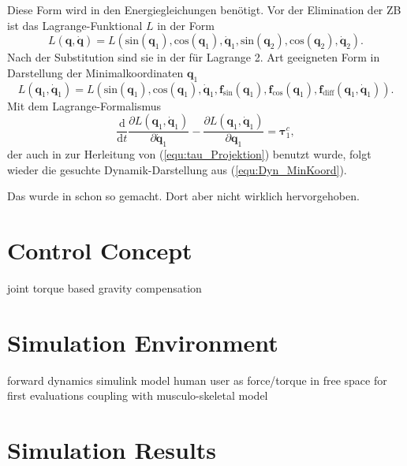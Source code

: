 \documentclass[letterpaper, 10 pt, conference]{ieeeconf}  %
\begin{document}
\label{sec:Lagrange2Elim}
%
Diese Form wird in den Energiegleichungen benötigt.
Vor der Elimination der ZB ist das Lagrange-Funktional $L$ in der Form
\begin{equation}
L(\bm{q},\dot{\bm{q}})=L(\mathrm{sin}(\bm{q}_1),\mathrm{cos}(\bm{q}_1),\dot{\bm{q}}_1,\mathrm{sin}(\bm{q}_2),\mathrm{cos}(\bm{q}_2),\dot{\bm{q}}_2).
\end{equation}
Nach der Substitution sind sie in der für Lagrange 2. Art geeigneten Form in Darstellung der Minimalkoordinaten $\bm{q}_1$
%
\begin{equation}
L(\bm{q}_1,\dot{\bm{q}}_1)=L(\mathrm{sin}(\bm{q}_1),\mathrm{cos}(\bm{q}_1),\dot{\bm{q}}_1,\bm{f}_\mathrm{sin}(\bm{q}_1),\bm{f}_\mathrm{cos}(\bm{q}_1), \bm{f}_\mathrm{diff}(\bm{q}_1,\dot{\bm{q}}_1)).
\end{equation}
%
Mit dem Lagrange-Formalismus
%
\begin{equation}
\frac{\mathrm{d}}{\mathrm{d}t}\frac{\partial L(\bm{q}_1,\dot{\bm{q}}_1)}{\partial \dot{\bm{q}}_1} - \frac{\partial L(\bm{q}_1,\dot{\bm{q}}_1)}{\partial \bm{q}_1} = \bm{\tau}^c_1,
\end{equation}
%
der auch in \cite{NakamuraGho1989} zur Herleitung von (\ref{equ:tau_Projektion}) benutzt wurde, folgt wieder die gesuchte Dynamik-Darstellung aus (\ref{equ:Dyn_MinKoord}).

%
Das wurde in \cite{WangGosselin1998} schon so gemacht. Dort aber nicht wirklich hervorgehoben.

\section{Control Concept}

joint torque based gravity compensation

\section{Simulation Environment}

forward dynamics
simulink model
human user as force/torque in free space for first evaluations
coupling with musculo-skeletal model \cite{KuehnHuSchHad2018}


\section{Simulation Results}
\end{document}
